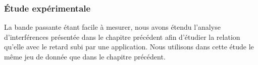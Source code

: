 
\subsubsection{Étude expérimentale}

La bande passante étant facile à mesurer, nous avons étendu l'analyse d'interférences présentée dans le chapitre précédent afin d'étudier la relation qu'elle avec le retard subi par une application.
Nous utilisons dans cette étude le même jeu de donnée que dans le chapitre précédent.

